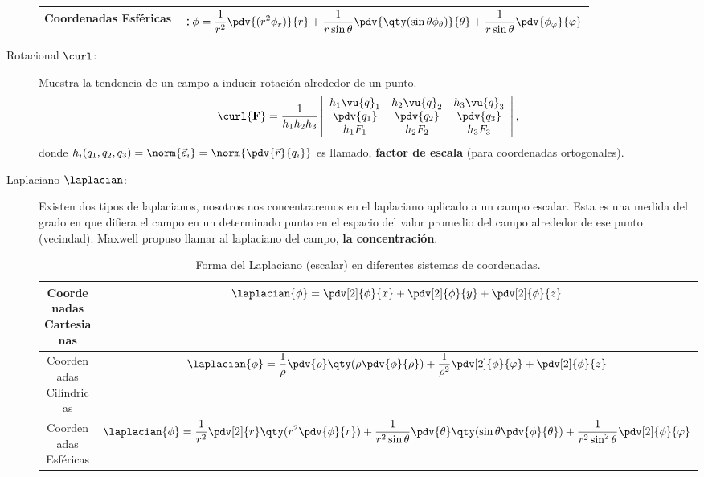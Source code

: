 \begin{mdframed}[style=warning]
\begin{description}
\begin{table}[H]
\begin{tabular}{||c|c||}
					\hline
						Coordenadas Esféricas & $ \div{\phi} = \dfrac{1}{r^2} \displaystyle\pdv{(r^2 \phi _r)}{r} + \dfrac{1}{r\sin{\theta}} \displaystyle\pdv{\qty(\sin{\theta} \phi _\theta)}{\theta} + \dfrac{1}{r\sin{\theta}} \displaystyle\pdv{\phi _\varphi}{\varphi} $ \\
					\hline
					\hline
				\end{tabular}
			\end{table}
		\item[Rotacional $\curl$: ] Muestra la tendencia de un campo a inducir rotación alrededor de un punto.
			$$ \curl{\Ff} = \frac{1}{h_1 h_2 h_3} \left|\begin{array}{ccc}	 
				h_1 \vu{q}_1 & h_2 \vu{q}_2 & h_3 \vu{q}_3 \\
				\pdv{q_1} & \pdv{q_2} & \pdv{q_3} \\
				h_1 F_1 & h_2 F_2 & h_3 F_3 
			\end{array}\right|, $$
			donde $h_i (q_1 ,q_2 ,q_3) = \norm{\vec{e}_i} = \norm{\pdv{\vec{r}}{q_i}}$ es llamado, \textbf{factor de escala} (para coordenadas ortogonales).
		\item[Laplaciano $\laplacian$: ] Existen dos tipos de laplacianos, nosotros nos concentraremos en el laplaciano aplicado a un campo escalar. Esta es una medida del grado en que difiera el campo en un determinado punto en el espacio del valor promedio del campo alrededor de ese punto (vecindad). Maxwell propuso llamar al laplaciano del campo, \textbf{la concentración}.
		\begin{table}[H]
				\centering
				\caption{Forma del Laplaciano (escalar) en diferentes sistemas de coordenadas.}
				\label{lap}
				\begin{tabular}{||c|c||}
					\hline
					\hline
						Coordenadas Cartesianas & $ \laplacian{\phi} = \displaystyle\pdv[2]{\phi}{x} +\displaystyle\pdv[2]{\phi}{y} + \displaystyle\pdv[2]{\phi}{z} $ \\
					\hline
						Coordenadas Cilíndricas & $ \laplacian{\phi} = \dfrac{1}{\rho} \displaystyle\pdv{\rho} \qty(\rho \displaystyle\pdv{\phi}{\rho}) + \dfrac{1}{\rho ^2} \displaystyle\pdv[2]{\phi}{\varphi} + \displaystyle\pdv[2]{\phi}{z} $ \\
					\hline
						Coordenadas Esféricas & $ \laplacian{\phi} = \dfrac{1}{r^2} \displaystyle\pdv[2]{r} \qty(r^2 \displaystyle\pdv{\phi}{r}) + \dfrac{1}{r^2 \sin{\theta}} \displaystyle\pdv{\theta} \qty(\sin{\theta} \displaystyle\pdv{\phi}{\theta}) + \frac{1}{r^2 \sin ^2 {\theta}} \displaystyle\pdv[2]{\phi}{\varphi} $ \\
					\hline
					\hline
				\end{tabular}
			\end{table}
	\end{description}
\end{mdframed}





